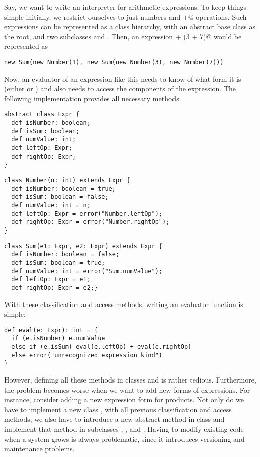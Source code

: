 \documentclass[11pt]{book}
\begin{document}
Say, we want to write an interpreter for arithmetic expressions.  To
keep things simple initially, we restrict ourselves to just numbers
and \verb@+@ operations. Such expressions can be represented as a class hierarchy, with an abstract base class \verb@Expr@ as the root, and two subclasses \verb@Number@ and
\verb@Sum@. Then, an expression  + (3 + 7)@ would be represented as
\begin{verbatim}
new Sum(new Number(1), new Sum(new Number(3), new Number(7)))
\end{verbatim}
Now, an evaluator of an expression like this needs to know of what
form it is (either \verb@Sum@ or \verb@Number@) and also needs to
access the components of the expression.  The following
implementation provides all necessary methods.
\begin{verbatim}
abstract class Expr {
  def isNumber: boolean;
  def isSum: boolean;
  def numValue: int;
  def leftOp: Expr;
  def rightOp: Expr;
}
\end{verbatim}
\begin{verbatim}
class Number(n: int) extends Expr {
  def isNumber: boolean = true;
  def isSum: boolean = false;
  def numValue: int = n;
  def leftOp: Expr = error("Number.leftOp");
  def rightOp: Expr = error("Number.rightOp");
}
\end{verbatim}
\begin{verbatim}
class Sum(e1: Expr, e2: Expr) extends Expr {
  def isNumber: boolean = false;
  def isSum: boolean = true;
  def numValue: int = error("Sum.numValue");
  def leftOp: Expr = e1;
  def rightOp: Expr = e2;}
\end{verbatim}
With these classification and access methods, writing an evaluator function is simple:
\begin{verbatim}
def eval(e: Expr): int = {
  if (e.isNumber) e.numValue
  else if (e.isSum) eval(e.leftOp) + eval(e.rightOp)
  else error("unrecognized expression kind")
}
\end{verbatim}
However, defining all these methods in classes \verb@Sum@ and
\verb@Number@ is rather tedious. Furthermore, the problem becomes worse 
when we want to add new forms of expressions. For instance, consider
adding a new expression form
\verb@Prod@ for products. Not only do we have to implement a new class \verb@Prod@, with all previous classification and access methods; we also have to introduce a
new abstract method \verb@isProduct@ in class \verb@Expr@ and
implement that method in subclasses \verb@Number@, \verb@Sum@, and
\verb@Prod@. Having to modify existing code when a system grows is always problematic, since it introduces versioning and maintenance problems. 
\end{document}
